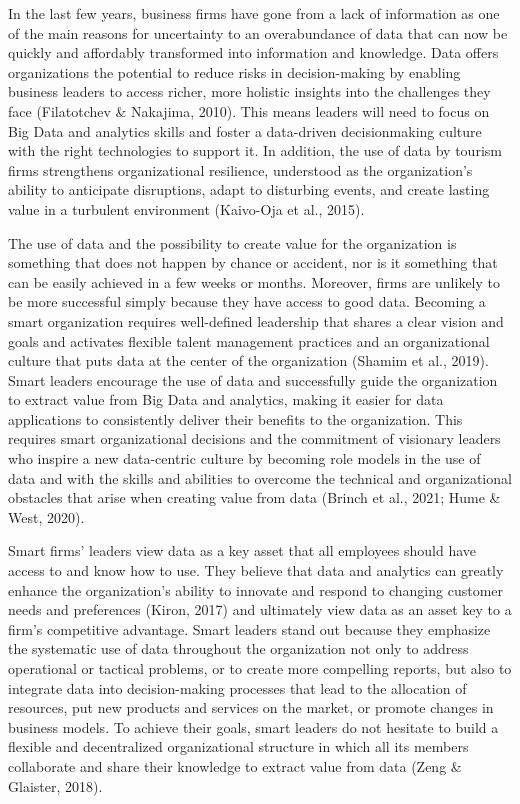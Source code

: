 \documentclass[
  letterpaper,
  DIV=11,
  numbers=noendperiod]{scrreprt}
\begin{document}
In the last few years, business firms have gone from a lack of
information as one of the main reasons for uncertainty to an
overabundance of data that can now be quickly and affordably transformed
into information and knowledge. Data offers organizations the potential
to reduce risks in decision-making by enabling business leaders to
access richer, more holistic insights into the challenges they face
(Filatotchev \& Nakajima, 2010). This means leaders will need to focus
on Big Data and analytics skills and foster a data-driven decisionmaking
culture with the right technologies to support it. In addition, the use
of data by tourism firms strengthens organizational resilience,
understood as the organization's ability to anticipate disruptions,
adapt to disturbing events, and create lasting value in a turbulent
environment (Kaivo-Oja et al., 2015).

The use of data and the possibility to create value for the organization
is something that does not happen by chance or accident, nor is it
something that can be easily achieved in a few weeks or months.
Moreover, firms are unlikely to be more successful simply because they
have access to good data. Becoming a smart organization requires
well-defined leadership that shares a clear vision and goals and
activates flexible talent management practices and an organizational
culture that puts data at the center of the organization (Shamim et al.,
2019). Smart leaders encourage the use of data and successfully guide
the organization to extract value from Big Data and analytics, making it
easier for data applications to consistently deliver their benefits to
the organization. This requires smart organizational decisions and the
commitment of visionary leaders who inspire a new data-centric culture
by becoming role models in the use of data and with the skills and
abilities to overcome the technical and organizational obstacles that
arise when creating value from data (Brinch et al., 2021; Hume \& West,
2020).

Smart firms' leaders view data as a key asset that all employees should
have access to and know how to use. They believe that data and analytics
can greatly enhance the organization's ability to innovate and respond
to changing customer needs and preferences (Kiron, 2017) and ultimately
view data as an asset key to a firm's competitive advantage. Smart
leaders stand out because they emphasize the systematic use of data
throughout the organization not only to address operational or tactical
problems, or to create more compelling reports, but also to integrate
data into decision-making processes that lead to the allocation of
resources, put new products and services on the market, or promote
changes in business models. To achieve their goals, smart leaders do not
hesitate to build a flexible and decentralized organizational structure
in which all its members collaborate and share their knowledge to
extract value from data (Zeng \& Glaister, 2018).
\end{document}
